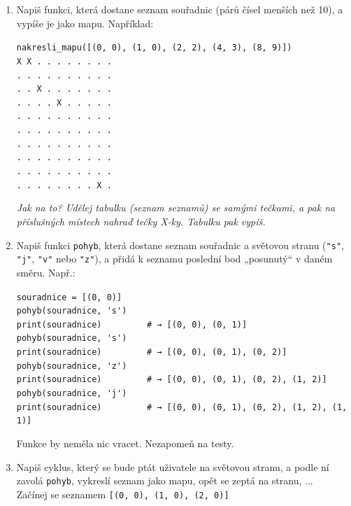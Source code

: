 \documentclass[a4paper,10pt]{article}
\begin{document}
\begin{enumerate}[resume]

\item \label{snakestart}
    Napiš funkci, která dostane seznam souřadnic (párů čísel menších než 10),
    a vypíše je jako mapu. Například:

\verb+nakresli_mapu([(0, 0), (1, 0), (2, 2), (4, 3), (8, 9)])+
\\\verb+X X . . . . . . . .+
\\\verb+. . . . . . . . . .+
\\\verb+. . X . . . . . . .+
\\\verb+. . . . X . . . . .+
\\\verb+. . . . . . . . . .+
\\\verb+. . . . . . . . . .+
\\\verb+. . . . . . . . . .+
\\\verb+. . . . . . . . . .+
\\\verb+. . . . . . . . . .+
\\\verb+. . . . . . . . X .+

    \emph{Jak na to?
        Udělej tabulku (seznam seznamů) se samými tečkami,
        a pak na příslušných místech nahraď tečky X-ky.
        Tabulku pak vypiš.}

\item Napiš funkci \verb+pohyb+, která dostane seznam souřadnic a světovou stranu
    (\verb+"s"+, \verb+"j"+, \verb+"v"+ nebo \verb+"z"+),
    a přidá k seznamu poslední bod „posunutý“ v daném směru. Např.:

  \verb+souradnice = [(0, 0)]+
\\\verb+pohyb(souradnice, 's')+
\\\verb+print(souradnice)         # → [(0, 0), (0, 1)]+
\\\verb+pohyb(souradnice, 's')+
\\\verb+print(souradnice)         # → [(0, 0), (0, 1), (0, 2)]+
\\\verb+pohyb(souradnice, 'z')+
\\\verb+print(souradnice)         # → [(0, 0), (0, 1), (0, 2), (1, 2)]+
\\\verb+pohyb(souradnice, 'j')+
\\\verb+print(souradnice)         # → [(0, 0), (0, 1), (0, 2), (1, 2), (1, 1)]+

    Funkce by neměla nic vracet.
    Nezapomeň na testy.

\item Napiš cyklus, který se bude ptát uživatele na světovou stranu,
    a podle ní zavolá \verb+pohyb+, vykreslí seznam jako mapu,
    opět se zeptá na stranu, ...
    \\Začínej se seznamem \verb+[(0, 0), (1, 0), (2, 0)]+


\end{enumerate}
\end{document}
